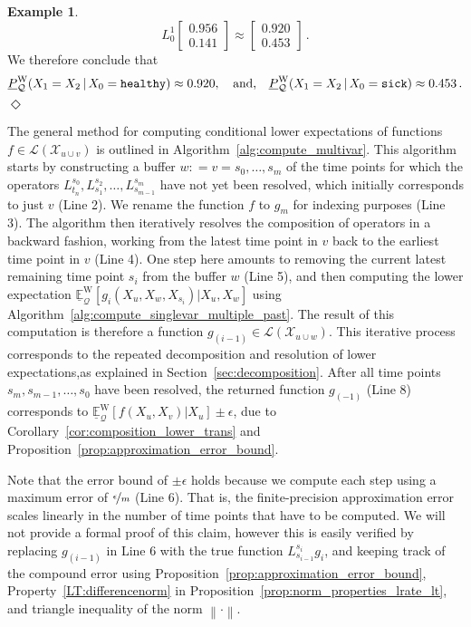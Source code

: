 \documentclass[10pt,a4paper]{paper}
\theoremstyle{definition}
\newtheorem{exmp}{Example}%
\newcommand{\states}{\mathcal{X}}
\newcommand{\gambles}{\mathcal{L}}
\newcommand{\rateset}{\mathcal{Q}}
\newcommand{\norm}[1]{\left\lVert #1 \right\rVert}
\newcommand{\coloneqq}{:\!=}
\newcommand{\exampleend}{\hfill$\Diamond$}
\begin{document}
\begin{exmp}
\begin{equation*}
L_0^1\left[\begin{array}{c}
0.956 \\
0.141
\end{array}\right] \approx \left[\begin{array}{c}
0.920 \\
0.453
\end{array}\right]\,.
\end{equation*}
We therefore conclude that
\begin{align*}
\underline{P}_{\rateset}^{\mathrm{W}}(X_1 = X_2\,\vert\,X_0=\text{{\tt healthy}}) \approx 0.920,\quad\text{and,}\quad \underline{P}_{\rateset}^{\mathrm{W}}(X_1 = X_2\,\vert\,X_0=\text{{\tt sick}}) \approx 0.453\,.
\end{align*}
\exampleend
\end{exmp}

The general method for computing conditional lower expectations of functions $f\in\gambles(\states_{u\cup v})$ is outlined in Algorithm~\ref{alg:compute_multivar}. This algorithm starts by constructing a buffer $w\coloneqq v=s_0,\ldots,s_m$ of the time points for which the operators $L_{t_n}^{s_0},L_{s_1}^{s_2},\ldots,L_{s_{m-1}}^{s_m}$ have not yet been resolved, which initially corresponds to just $v$ (Line 2). We rename the function $f$ to $g_m$ for indexing purposes (Line 3). The algorithm then iteratively resolves the composition of operators in a backward fashion, working from the latest time point in $v$ back to the earliest time point in $v$ (Line 4). One step here amounts to removing the current latest remaining time point $s_i$ from the buffer $w$ (Line 5), and then computing the lower expectation $\underline{\mathbb{E}}_{\rateset}^\mathrm{W}[g_i(X_u,X_w,X_{s_i})\vert X_u,X_w]$ using Algorithm~\ref{alg:compute_singlevar_multiple_past}. The result of this computation is therefore a function $g_{(i-1)}\in\gambles(\states_{u\cup w})$. This iterative process corresponds to the repeated decomposition and resolution of lower expectations,as explained in Section~\ref{sec:decomposition}. After all time points $s_m,s_{m-1},\ldots,s_0$ have been resolved, the returned function $g_{(-1)}$ (Line 8) corresponds to $\underline{\mathbb{E}}_{\rateset}^\mathrm{W}[f(X_u,X_v)\vert X_u]\pm\epsilon$, due to Corollary~\ref{cor:composition_lower_trans} and Proposition~\ref{prop:approximation_error_bound}.

Note that the error bound of $\pm\epsilon$ holds because we compute each step using a maximum error of $\nicefrac{\epsilon}{m}$ (Line 6). That is, the finite-precision approximation error scales linearly in the number of time points that have to be computed. We will not provide a formal proof of this claim, however this is easily verified by replacing $g_{(i-1)}$ in Line 6 with the true function $L_{s_{i-1}}^{s_i}g_i$, and keeping track of the compound error using Proposition~\ref{prop:approximation_error_bound}, Property~\ref{LT:differencenorm} in Proposition~\ref{prop:norm_properties_lrate_lt}, and triangle inequality of the norm $\norm{\cdot}$.
\end{document}
